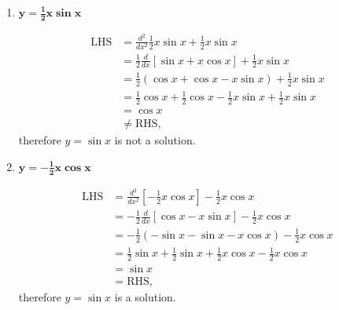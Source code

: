 \documentclass[12pt]{article}
\begin{document}
\begin{enumerate}
\begin{enumerate}
              \item $\bm{y = \frac{1}{2}x \sin x}$

                    \begin{align*}
                        \text{LHS} & = \frac{d^2}{dx^2} \tfrac{1}{2} x \sin x + \tfrac{1}{2} x \sin x                            \\
                                   & = \tfrac{1}{2}\frac{d}{dx}[\sin x + x \cos x] + \tfrac{1}{2} x \sin x                       \\
                                   & = \tfrac{1}{2}(\cos x + \cos x - x \sin x) + \tfrac{1}{2} x \sin x                          \\
                                   & = \tfrac{1}{2} \cos x + \tfrac{1}{2} \cos x - \tfrac{1}{2} x \sin x + \tfrac{1}{2} x \sin x \\
                                   & = \cos x                                                                                    \\
                                   & \neq \text{RHS},
                    \end{align*}
                    therefore $y = \sin x$ is not a solution. \medskip
              \item $\bm{y = -\frac{1}{2}x \cos x}$

                    \begin{align*}
                        \text{LHS} & = \frac{d^2}{dx^2}[-\tfrac{1}{2} x \cos x] - \tfrac{1}{2} x \cos x                          \\
                                   & = -\tfrac{1}{2}\frac{d}{dx}[\cos x - x \sin x] - \tfrac{1}{2} x \cos x                      \\
                                   & = -\tfrac{1}{2}(-\sin x - \sin x - x \cos x) - \tfrac{1}{2} x \cos x                        \\
                                   & = \tfrac{1}{2} \sin x + \tfrac{1}{2} \sin x + \tfrac{1}{2} x \cos x - \tfrac{1}{2} x \cos x \\
                                   & = \sin x                                                                                    \\
                                   & = \text{RHS},
                    \end{align*}
                    therefore $y = \sin x$ is a solution.
          \end{enumerate}


\end{enumerate}
\end{document}
